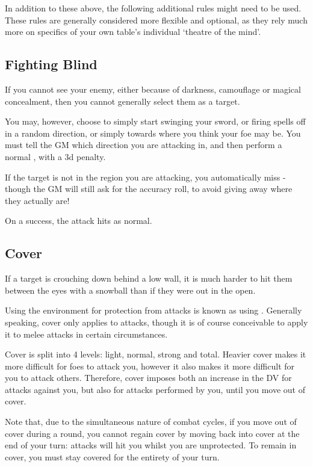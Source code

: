 In addition to these above, the following additional rules might need to be used. These rules are generally considered more flexible and optional, as they rely much more on specifics of your own table's individual `theatre of the mind'.

\subsection{Fighting Blind}\label{S:Unseen}

If you cannot see your enemy, either because of darkness, camouflage or magical concealment, then you cannot generally select them as a target. 

You may, however, choose to simply start swinging your sword, or firing spells off in a random direction, or simply towards where you think your foe may be. You must tell the GM which direction you are attacking in, and then perform a normal , with a 3d penalty.

If the target is not in the region  you are attacking, you automatically miss - though the GM will still ask for the accuracy roll, to avoid giving away where they actually are!

On a success, the attack hits as normal.  

\subsection{Cover}

If a target is crouching down behind a low wall, it is much harder to hit them between the eyes with a snowball than if they were out in the open. 

Using the environment for protection from attacks is known as using . Generally speaking, cover only applies to  attacks, though it is of course conceivable to apply it to melee attacks in certain circumstances. 

Cover is split into 4 levels: light, normal, strong and total. Heavier cover makes it more difficult for foes to attack you, however it also makes it more difficult for you to attack others. Therefore, cover imposes both an increase in the DV for attacks against you, but also for attacks performed by you, until you move out of cover. 

Note that, due to the simultaneous nature of combat cycles, if you move out of cover during a round, you cannot regain cover by moving back into cover at the end of your turn: attacks will hit you whilst you are unprotected. To remain in cover, you must stay covered for the entirety of your turn.

